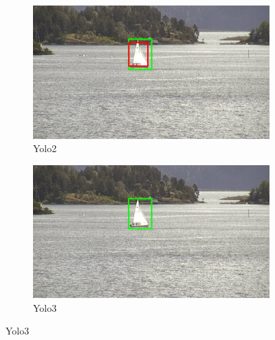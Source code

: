 \begin{figure}[h!]
\begin{subfigure}{.5\textwidth}
  \centering
  \includegraphics[width=0.9\linewidth]{results/case_buildings/yolo23/2better/yolo2/selected_08_04_frame1690.jpg}
  \caption{Yolo2}
\end{subfigure}%
\begin{subfigure}{.5\textwidth}
  \centering
  \includegraphics[width=.9\linewidth]{results/case_buildings/yolo23/2better/yolo3/selected_08_04_frame1690.jpg}
  \caption{Yolo3}
\end{subfigure}


\end{figure}
